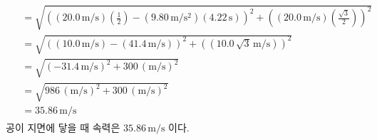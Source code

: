 \documentclass[APS,floatfix,nofootinbib,superscriptaddress,fleqn,preprint]{revtex4}
\begin{document}
\begin{itemize}
\begin{align}
\begin{split}
      &=\sqrt{{\left((20.0\,\mathrm{m/s})\left(\frac{1}{2}\right)
      -(9.80\,\mathrm{m/s^2})(4.22\,\mathrm{s})\right)}^2
      +{\left((20.0\,\mathrm{m/s})\left(\frac{\sqrt{3}}{2}\right)\right)}^2}  \\
      &=\sqrt{{\left((10.0\,\mathrm{m/s})
      -(41.4\,\mathrm{m/s})\right)}^2
      +{\left((10.0\,\sqrt{3}\,\mathrm{m/s})\right)}^2} \\
      &=\sqrt{{\left(-31.4\,\mathrm{m/s}\right)}^2
      +300\,\mathrm{{(m/s)}^2}} \\
      &=\sqrt{986\,\mathrm{{(m/s)}^2}
      +300\,\mathrm{{(m/s)}^2}} \\
      &=35.86\,\mathrm{m/s}
    \end{split}
  \end{align}
  공이 지면에 닿을 때 속력은 $35.86\,\mathrm{m/s}$ 이다.
  
  \vspace{0.5cm}
  
\end{itemize} 


\vspace{0.5cm}



\vspace{0.5cm}


\end{document}
